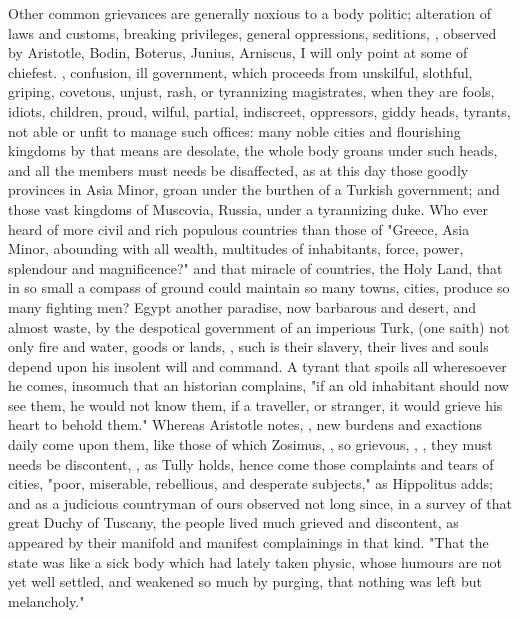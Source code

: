 Other common grievances are generally noxious to a body politic; alteration of
laws and customs, breaking privileges, general oppressions, seditions, \etc{},
observed by Aristotle, Bodin, Boterus, Junius, Arniscus,
\etc{} I will only point at some of chiefest.
, confusion, ill
government, which proceeds from unskilful, slothful, griping, covetous, unjust,
rash, or tyrannizing magistrates, when they are fools, idiots, children, proud,
wilful, partial, indiscreet, oppressors, giddy heads, tyrants, not able or
unfit to manage such offices: many noble cities and
flourishing kingdoms by that means are desolate, the whole body groans under
such heads, and all the members must needs be disaffected, as at this day those
goodly provinces in Asia Minor, \etc{} groan under the burthen of a Turkish
government; and those vast kingdoms of Muscovia, Russia,
under a tyrannizing duke. Who ever heard of more civil and
rich populous countries than those of "Greece, Asia Minor, abounding with all
wealth, multitudes of inhabitants, force, power, splendour
and magnificence?" and that miracle of countries, the Holy
Land, that in so small a compass of ground could maintain so many towns,
cities, produce so many fighting men? Egypt another paradise, now barbarous and
desert, and almost waste, by the despotical government of an imperious Turk,
 (one saith) not
only fire and water, goods or lands, , such is their slavery, their lives and souls depend upon
his insolent will and command. A tyrant that spoils all wheresoever he comes,
insomuch that an historian complains, "if an old inhabitant
should now see them, he would not know them, if a traveller, or stranger, it
would grieve his heart to behold them." Whereas Aristotle
notes, , new burdens and exactions
daily come upon them, like those of which Zosimus, , so grievous, , \etc{}, they must needs be discontent, , as Tully holds, hence come
those complaints and tears of cities, "poor, miserable, rebellious, and
desperate subjects," as Hippolitus adds; and
as a judicious countryman of ours observed not long since,
in a survey of that great Duchy of Tuscany, the people lived much grieved and
discontent, as appeared by their manifold and manifest complainings in that
kind. "That the state was like a sick body which had lately taken physic, whose
humours are not yet well settled, and weakened so much by purging, that nothing
was left but melancholy."

